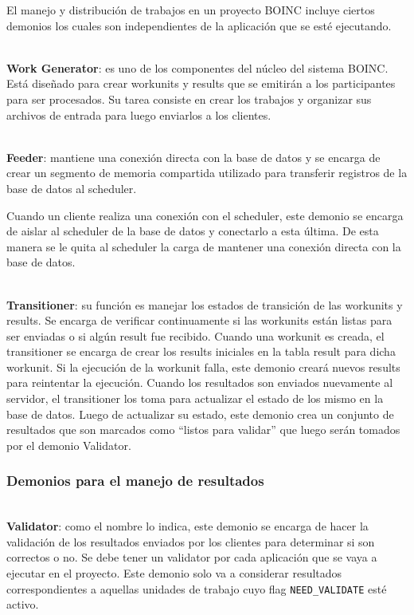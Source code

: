 El manejo y distribución de trabajos en un proyecto BOINC incluye ciertos demonios los cuales son independientes de la aplicación que se esté ejecutando.

\textbf{\\Work Generator}: es uno de los componentes del núcleo del sistema BOINC. Está diseñado para crear workunits y results que se emitirán a los participantes para ser procesados. Su tarea consiste en crear los trabajos y organizar sus archivos de entrada para luego enviarlos a los clientes.

\textbf{\\Feeder}: mantiene una conexión directa con la base de datos y se encarga de crear un segmento de memoria compartida utilizado para transferir registros de la base de datos al scheduler.
 
Cuando un cliente realiza una conexión con el scheduler, este demonio se encarga de aislar al scheduler de la base de datos y conectarlo a esta última. De esta manera se le quita al scheduler la carga de mantener una conexión directa con la base de datos.

\textbf{\\Transitioner}: su función es manejar los estados de transición de las workunits y results. Se encarga de verificar continuamente si las workunits están listas para ser enviadas o si algún result fue recibido.
Cuando una workunit es creada, el transitioner se encarga de crear los results iniciales en la tabla result para dicha workunit. Si la ejecución de la workunit falla, este demonio creará nuevos results para reintentar la ejecución. Cuando los resultados son enviados nuevamente al servidor, el transitioner los toma para actualizar el estado de los mismo en la base de datos. Luego de actualizar su estado, este demonio crea un conjunto de resultados que son marcados como “listos para validar” que luego serán tomados por el demonio Validator.

\subsubsection{Demonios para el manejo de resultados}
\label{seccion:demonio:validator}
\textbf{\\Validator}: como el nombre lo indica, este demonio se encarga de hacer la validación de los resultados enviados por los clientes para determinar si son correctos o no. Se debe tener un validator por cada aplicación que se vaya a ejecutar en el proyecto. Este demonio solo va a considerar resultados correspondientes a aquellas unidades de trabajo cuyo flag \texttt{NEED\_VALIDATE} esté activo. 

